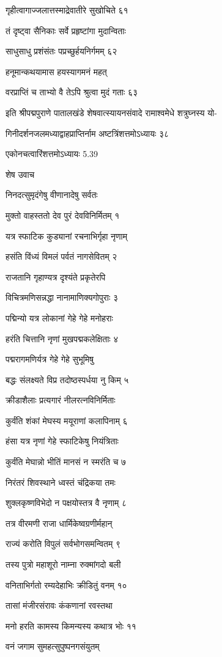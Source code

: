 गृहीत्वागाज्जलात्तस्माद्रेवातीरे सुखोचिते ६१

तं दृष्ट्वा सैनिकाः सर्वे प्रहृष्टांगा मुदान्विताः

साधुसाधु प्रशंसंतः पप्रच्छुर्हयनिर्गमम् ६२

हनूमान्कथयामास हयस्यागमनं महत्

वरप्राप्तिं च ताभ्यो वै तेऽपि श्रुत्वा मुदं गताः ६३

इति श्रीपद्मपुराणे पातालखंडे शेषवात्स्यायनसंवादे रामाश्वमेधे शत्रुघ्नस्य यो-

गिनीदर्शनजलमध्याद्वाहप्राप्तिर्नाम अष्टत्रिंशत्तमोऽध्यायः ३८

एकोनचत्वारिंशत्तमोऽध्यायः 5.39

शेष उवाच

निनदत्सुमृदंगेषु वीणानादेषु सर्वतः

मुक्तो वाहस्ततो देव पुरं देवविनिर्मितम् १

यत्र स्फाटिक कुड्यानां रचनाभिर्गृहा नृणाम्

हसंति विंध्यं विमलं पर्वतं नागसेवितम् २

राजतानि गृहाण्यत्र दृश्यंते प्रकृतेरपि

विचित्रमणिसन्नद्धा नानामाणिक्यगोपुराः ३

पद्मिन्यो यत्र लोकानां गेहे गेहे मनोहराः

हरंति चित्तानि नृणां मुखपद्मकलेक्षिताः ४

पद्मरागमणिर्यत्र गेहे गेहे सुभूमिषु

बद्धः संलक्ष्यते विप्र तदोष्ठस्पर्धया नु किम् ५

क्रीडाशैलाः प्रत्यगारं नीलरत्नविनिर्मिताः

कुर्वंति शंकां मेघस्य मयूराणां कलापिनाम् ६

हंसा यत्र नृणां गेहे स्फाटिकेषु नियंत्रिताः

कुर्वंति मेघान्नो भीतिं मानसं न स्मरंति च ७

निरंतरं शिवस्थाने ध्वस्तं चंद्रिकया तमः

शुक्लकृष्णविभेदो न पक्षयोस्तत्र वै नृणाम् ८

तत्र वीरमणी राजा धार्मिकेष्वग्रणीर्महान्

राज्यं करोति विपुलं सर्वभोगसमन्वितम् ९

तस्य पुत्रो महाशूरो नाम्ना रुक्मांगदो बली

वनिताभिर्गतो रम्यदेहाभिः क्रीडितुं वनम् १०

तासां मंजीरसंरावः कंकणानां रवस्तथा

मनो हरति कामस्य किमन्यस्य कथात्र भोः ११

वनं जगाम सुमहत्सुपुष्पनगसंयुतम्

